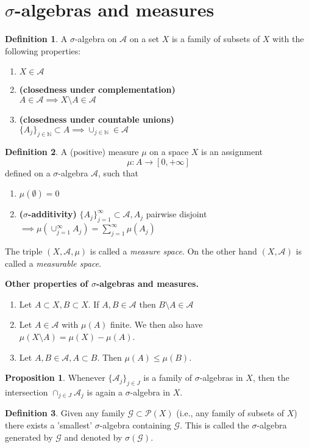 \documentclass[a4paper,14pt]{extarticle}
\theoremstyle{definition}
\newtheorem{definition}{Definition}
\newtheorem{proposition}{Proposition}
\begin{document}
\section{$\sigma$-algebras and measures}
\begin{definition}
  A $\sigma$-algebra on $\mathcal{A}$ on a set 
  $X$ is a family of subsets of $X$ with 
  the following properties:
  \begin{enumerate}
    \item $X\in\mathcal{A}$
    \item \textbf{(closedness under complementation)}\\ $A\in\mathcal{A}\implies X\setminus A\in\mathcal{A}$
    \item \textbf{(closedness under countable unions)}\\ $\{A_j\}_{j\in\mathbb{N}}\subset A\implies
    \cup_{j\in\mathbb{N}}\in\mathcal{A}$
  \end{enumerate}
\end{definition}
\begin{definition}
  A (positive) measure $\mu$ on a space $X$ is 
  an assignment \[\mu:A\rightarrow[0,+\infty]\]
  defined on a $\sigma$-algebra $\mathcal{A}$,
  such that 
  \begin{enumerate}
    \item $\mu(\emptyset)=0$
    \item \textbf{($\sigma$-additivity)} $\{A_j\}_{j=1}^\infty\subset\mathcal{A}, A_j$ pairwise disjoint $\implies \mu(\cup_{j=1}^\infty A_j)=
    \sum_{j=1}^\infty \mu(A_j)$
  \end{enumerate}
  The triple $(X,\mathcal{A},\mu)$ is called a 
  \textit{measure space}. On the other hand 
  $(X,\mathcal{A})$ is called a \textit{measurable space}.
\end{definition}
\textbf{Other properties of $\sigma$-algebras and measures.}
\begin{enumerate}
  \item Let $A\subset X,B\subset X$. If $A,B\in\mathcal{A}$ then $B\setminus A\in\mathcal{A}$
  \item Let $A\in\mathcal{A}$ with $\mu(A)$ finite. We then also have $\mu(X\setminus A)=\mu(X)-\mu(A)$.
  \item Let $A,B\in\mathcal{A}, A\subset B$. Then 
  $\mu(A)\leq \mu(B)$.
\end{enumerate}
\begin{proposition}
  Whenever $\{\mathcal{A}_j\}_{j\in J}$ is a family of $\sigma$-algebras in $X$, then the intersection
  $\cap_{j\in J}\mathcal{A}_j$ is again a 
  $\sigma$-algebra in $X$.
\end{proposition}
\begin{definition}
  Given any family $\mathcal{G}\subset\mathcal{P}(X)$ (i.e., any family of subsets of $X$) there exists a 'smallest' $\sigma$-algebra containing 
  $\mathcal{G}$. This is called the $\sigma$-algebra
  generated by $\mathcal{G}$ and denoted by $\sigma(\mathcal{G})$.
\end{definition}
\newpage
\end{document}
